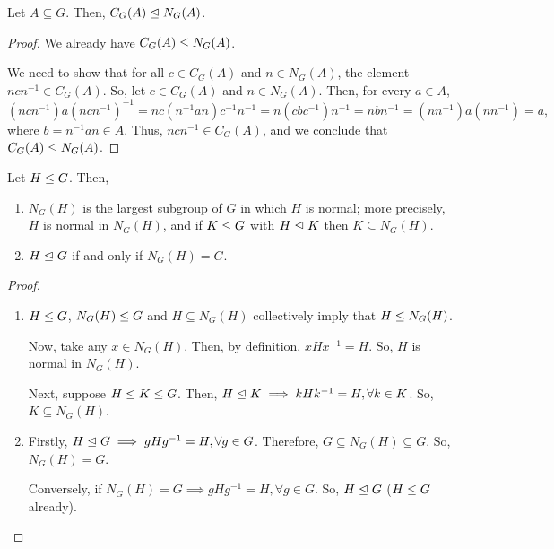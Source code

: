 \documentclass[11pt]{penrose}
\begin{document}
\begin{nprop}
    Let $A \subseteq G$. Then, $C_{G}(A) \mathrel{\trianglelefteq} N_{G}(A)$.
\end{nprop}
\begin{proof}
    We already have $C_{G}(A) \mathrel{\leq} N_{G}(A)$.

    We need to show that for all $c \in C_{G}(A)$ and $n \in N_{G}(A)$, the element $n c n^{-1} \in C_{G}(A)$. So, let $c \in C_{G}(A)$ and $n \in N_{G}(A)$. Then, for every $a \in A$,
    \begin{equation*}
        (ncn^{-1}) a (ncn^{-1})^{-1}
        = nc(n^{-1} a n)c^{-1}n^{-1}
        = n(cbc^{-1})n^{-1}
        = nbn^{-1}
        = (nn^{-1}) a (nn^{-1})
        = a,
    \end{equation*}
    where $b = n^{-1} a n \in A$. Thus, $n c n^{-1} \in C_{G}(A)$, and we conclude that $C_{G}(A) \mathrel{\trianglelefteq} N_{G}(A)$.
\end{proof}

\begin{nprop}
    Let $H \mathrel{\leq} G$. Then,
    \begin{enumerate}
        \item $N_{G}(H)$ is the largest subgroup of $G$ in which $H$ is normal; more precisely, $H$ is normal in $N_{G}(H)$, and if $K \mathrel{\leq} G$ with $H \mathrel{\trianglelefteq} K$ then $K \subseteq N_{G}(H)$.
        \item $H \mathrel{\trianglelefteq} G$ if and only if $N_{G}(H) = G$.
    \end{enumerate}
\end{nprop}
\begin{proof}\phantom{}
    \begin{enumerate}
        \item $H \mathrel{\leq} G$, $N_{G}(H) \mathrel{\leq} G$ and $H \subseteq N_{G}(H)$ collectively imply that $H \mathrel{\leq} N_{G}(H)$.

        Now, take any $x \in N_{G}(H)$. Then, by definition, $xHx^{-1} = H$. So, $H$ is normal in $N_{G}(H)$.

        Next, suppose $H \mathrel{\trianglelefteq} K \mathrel{\leq} G$. Then, $H \mathrel{\trianglelefteq} K \implies kHk^{-1} = H, \forall k \in K$. So, $K \subseteq N_{G}(H)$.

        \item Firstly, $H \mathrel{\trianglelefteq} G \implies gHg^{-1} = H, \forall g \in G$. Therefore, $G \subseteq N_{G}(H) \subseteq G$. So, $N_{G}(H) = G$.

        Conversely, if $N_{G}(H) = G \implies gHg^{-1} = H, \forall g \in G$. So, $H \mathrel{\trianglelefteq} G$ ($H \mathrel{\leq} G$ already).\qedhere
    \end{enumerate}
\end{proof}
\end{document}
